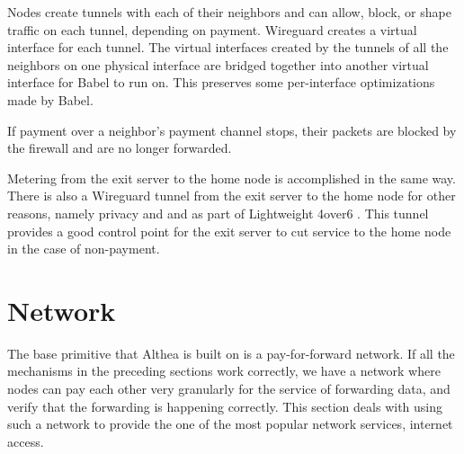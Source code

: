 \documentclass[11pt]{article}
\newlength{\currentparskip}
\newenvironment{unbreakable}
  {\setlength{\currentparskip}{\parskip}%
	 \vspace{\currentparskip}
   \begin{minipage}{\textwidth}%
   \setlength{\parskip}{\currentparskip}%
  }
  {\end{minipage}\vspace{\currentparskip}}
\begin{document}
\begin{unbreakable}
\begin{figure}
\end{figure}

Nodes create tunnels with each of their neighbors and can allow, block, or shape traffic on each tunnel, depending on payment. Wireguard creates a virtual interface for each tunnel. The virtual interfaces created by the tunnels of all the neighbors on one physical interface are bridged together into another virtual interface for Babel to run on. This preserves some per-interface optimizations made by Babel.

If payment over a neighbor’s payment channel stops, their packets are blocked by the firewall and are no longer forwarded.
\end{unbreakable}

Metering from the exit server to the home node is accomplished in the same way. There is also a Wireguard tunnel from the exit server to the home node for other reasons, namely privacy and and as part of Lightweight 4over6 \cite{4over6}. This tunnel provides a good control point for the exit server to cut service to the home node in the case of non-payment. 

\section{Network}
\label{sec:network}
The base primitive that Althea is built on is a pay-for-forward network. If all the mechanisms in the preceding sections work correctly, we have a network where nodes can pay each other very granularly for the service of forwarding data, and verify that the forwarding is happening correctly. This section deals with using such a network to provide the one of the most popular network services, internet access.

\begin{figure}[h]
\end{figure}
\end{document}
